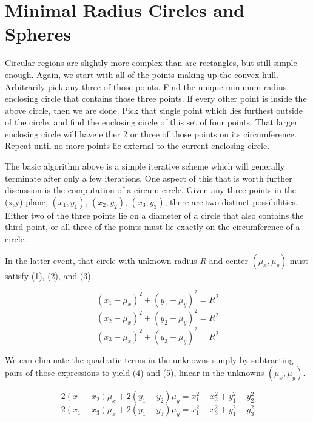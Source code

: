 \documentclass[a4paper,11pt]{article}
\begin{document}
\bigskip


\section{Minimal Radius Circles and Spheres}

Circular regions are slightly more complex than are rectangles, but still simple enough.
Again, we start with all of the points making up the convex hull. Arbitrarily pick any three
of those points. Find the unique minimum radius enclosing circle that contains those three
points. If every other point is inside the above circle, then we are done. Pick that single
point which lies furthest outside of the circle, and find the enclosing circle of this set of
four points. That larger enclosing circle will have either 2 or three of those points on its
circumference. Repeat until no more points lie external to the current enclosing circle.

The basic algorithm above is a simple iterative scheme which will generally terminate
after only a few iterations. One aspect of this that is worth further discussion is the
computation of a circum-circle. Given any three points in the (x,y) plane, $(x_1,y_1)$,
$(x_2,y_2)$, $(x_3,y_3)$, there are two distinct possibilities. Either two of the three
points lie on a diameter
of a circle that also contains the third point, or all three of the points must lie exactly on the
circumference of a circle.

In the latter event, that circle with unknown radius $R$ and center $(\mu_x,\mu_y)$ must
satisfy (1), (2), and (3).

\begin{equation} \tag{1}
   (x_1 - \mu_x)^2 + (y_1 - \mu_y)^2 = R^2
\end{equation}
\begin{equation} \tag{2}
   (x_2 - \mu_x)^2 + (y_2 - \mu_y)^2 = R^2
\end{equation}
\begin{equation} \tag{3}
   (x_3 - \mu_x)^2 + (y_3 - \mu_y)^2 = R^2
\end{equation}

We can eliminate the quadratic terms in the unknowns simply by subtracting pairs of 
those expressions to yield (4) and (5), linear in the unknowns $(\mu_x,\mu_y)$.

\begin{equation} \tag{4}
   2(x_1 - x_2)\mu_x + 2(y_1 - y_2)\mu_y = x_1^2 - x_2^2 + y_1^2 - y_2^2  
\end{equation}
\begin{equation} \tag{5}
   2(x_1 - x_3)\mu_x + 2(y_1 - y_3)\mu_y = x_1^2 - x_3^2 + y_1^2 - y_3^2  
\end{equation}
\end{document}
